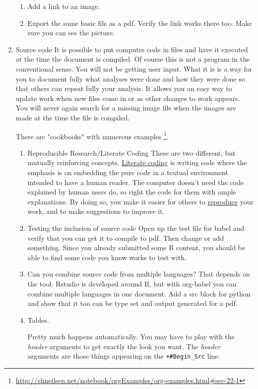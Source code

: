 \documentclass{article}
\begin{document}
\begin{enumerate}
\begin{enumerate}
\item Add a link to an image.
\item Export the same basic file as a pdf. Verify the link works there too. Make sure you can see the picture.
\end{enumerate}
\item Source code
\label{sec:org225bc38}
It is possible to put computer code in files and have it executed at the time the document is compiled. Of course this is not a program in the conventional sense. You will not be getting user input. What it is is a way for you to document fully what analyses were done and how they were done so that others can repeat fully your analysis. It allows you an easy way to update work when new files come in or as other changes to work appears. You will never again search for a missing image file when the images are made at the time the file is compiled.

There are "cookbooks" with numerous examples \footnote{\url{http://ehneilsen.net/notebook/orgExamples/org-examples.html\#sec-22-1}}. 
\begin{enumerate}
\item Reproducible Research/Literate Coding
\label{sec:org44f77d6}
These are two different, but mutually reinforcing concepts. \href{https://en.wikipedia.org/wiki/Literate\_programming}{Literate coding} is writing code where the emphasis is on embedding the pure code in a textual environment intended to have a human reader. The computer doesn't need the code explained by human users do, so right the code for them with ample explanations. By doing so, you make it easier for others to \href{https://www.pnas.org/content/112/6/1645/}{reproduce} your work, and to make suggestions to improve it. 
\item Testing the inclusion of source code
\label{sec:org58d3884}
Open up the test file for babel and verify that you can get it to compile to pdf. Then change or add something. Since you already submitted some R content, you should be able to find some code you know works to test with. 
\item Can you combine source code from multiple languages?
\label{sec:org0f81799}
That depends on the tool. Rstudio is developed around R, but with org-babel you can combine multiple languages in one document. Add a src block for python and show that it too can be type set and output generated for a pdf. 
\item Tables.
\label{sec:org1805884}

Pretty much happens automatically. You may have to play with the \emph{header} arguments to get exactly the look you want. The \emph{header} arguments are those things appearing on the \texttt{+\#Begin\_Src} line. 


\end{enumerate}
\end{enumerate}
\end{document}
